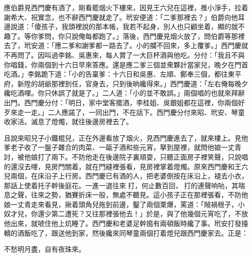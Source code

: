 應伯爵見西門慶有酒了，剛看罷烟火下樓來，因見王六兒在這裡，推小淨手，拉着謝希大、祝實念，也不辭西門慶就走了。玳安便道：「二爹那裡去？」伯爵向他耳邊說道：「傻孩子，我頭裡說的那本帳，我若不起身，別人也只顧坐着，顯的就不趣了。等你爹問，你只說俺每都跑了。」落後，西門慶見烟火放了，問伯爵等那裡去了，玳安道：「應二爹和謝爹都一路去了。小的攔不回來，多上覆爹。」西門慶就不再問了。因叫過李銘、吳惠來，每人賞了一大巨杯酒與他吃。分付：「我且不與你唱錢，你兩個到十六日早來答應。還是應二爹三個並衆夥計當家兒，晚夕在門首吃酒。」李銘跪下道：「小的告稟爹：十六日和吳惠、左順、鄭奉三個，都往東平府，新陞的胡爺那裡到任，官身去，只到後晌纔得來。」西門慶道：「左右俺每晚夕纔吃酒哩。你只休誤了就是了。」二人道：「小的並不敢誤。」兩個唱的也就來拜辭出門。西門慶分付：「明日，家中堂客擺酒，李桂姐、吳銀姐都在這裡，你兩個好歹來走一走。」二人應諾了，一同出門，不在話下。西門慶分付來昭、玳安、琴童收家活。滅息了燈燭，就往後邊房裡去了。

且說來昭兒子小鐵棍兒，正在外邊看放了烟火，見西門慶進去了，就來樓上。見他爹老子收了一盤子雜合的肉菜、一甌子酒和些元宵，拏到屋裡，就問他娘一丈青討，被他娘打了兩下。不防他走在後邊院子裏頑耍，只聽正面房子裡笑聲，只說唱的還沒去哩，見房門關着，就在門縫裡張看，見房裡掌着燈燭。原來西門慶和王六兒兩個，在床沿子上行房。西門慶已有酒的人，把老婆倒按在床沿上，褪去小衣，那話上使着托子幹後庭花。一進一退往來𢵞打，何止數百回，𢵞打的連聲响喨，其喘息之聲，往來之勢，猶賽折床一般，無處不聽見。這小孩子正在那裡張看，不防他娘一丈青走來看見，揪着頭角兒拖到前邊，鑿了兩個栗爆，罵道：「賊禍根子，小奴才兒，你還少第二遭死？又往那裡張他去！」於是，與了他幾個元宵吃了，不放他出來，就唬住他上炕睡了。西門慶和老婆足幹搗有兩頓飯時纔了事。玳安打發擡轎的酒飯吃了，跟送他到家，然後纔來同琴童兩個打着燈兒跟西門慶家去。正是：

\begin{myquote}
不愁明月盡，自有夜珠來。
\end{myquote}

